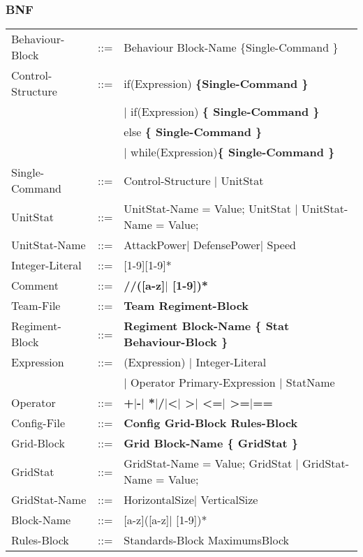 	\subsubsection{BNF}
		\begin{tabular}{ l l l }
			Behaviour-Block	   &	::=	 & Behaviour Block-Name \{Single-Command \} \\
			Control-Structure  &  	::=  & if(Expression) \bf{\{}Single-Command \bf{\}}  \\
							   &		 & $\mid$ if(Expression) \bf{\{ }Single-Command \bf{\}} \\
							   &   		 & else \bf{\{ }Single-Command \bf{\} } \\					   
							   &   		 & $\mid$ while(Expression)\bf{\{ } Single-Command \bf{\}} \\
			Single-Command     &	::=  & Control-Structure $\mid$ UnitStat \\
			UnitStat		   &	::=  & UnitStat-Name = Value; UnitStat $\mid$ UnitStat-Name = Value; \\
			UnitStat-Name	   &	::=	 & AttackPower$\mid$ DefensePower$\mid$ Speed \\
			Integer-Literal    &	::=  & [1-9][1-9]* \\
			Comment			   &	::=	 & \bf{//}([a-z]$\mid$ [1-9])* \\
			Team-File		   &	::=	 & \bf{Team} Regiment-Block \\
			Regiment-Block     &	::=	 & \bf{Regiment} Block-Name	 \bf{\{ } Stat Behaviour-Block \bf{\} }\\
			Expression		   &	::=  & (Expression) $\mid$ Integer-Literal \\
							   &		 &	$\mid$ Operator Primary-Expression $\mid$ StatName \\
			Operator 		   & 	::=	 & \bf{+}$\mid$\bf{-}$\mid$ \bf{*}$\mid$\bf{/}$\mid$\bf{<}$\mid$ \bf{>}$\mid$ \bf{<=}$\mid$ \bf{>=}$\mid$\bf{==}\\
			Config-File		   & 	::=  & \bf{Config} Grid-Block Rules-Block  		\\
			Grid-Block		   &	::=	 & \bf{Grid} Block-Name	 \bf{\{} GridStat \bf{\}} \\
			GridStat		   &	::=  & GridStat-Name = Value; GridStat $\mid$ GridStat-Name = Value;   \\
			GridStat-Name	   &	::=  & HorizontalSize$\mid$ VerticalSize					\\
			Block-Name		   &	::=  & [a-z]([a-z]$\mid$ [1-9])* 							\\
			Rules-Block		   &	::=	 & Standards-Block MaximumsBlock 				\\

\end{tabular}
